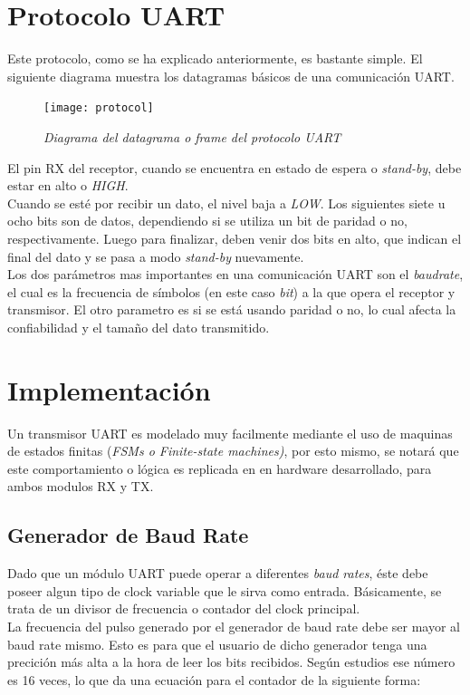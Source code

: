 \documentclass{article}
\begin{document}
\newpage
\section{Protocolo UART}
\indent Este protocolo, como se ha explicado anteriormente, es bastante simple. El siguiente diagrama muestra los
datagramas básicos de una comunicación UART.

\begin{figure}[H]
    \texttt{[image: protocol]}
    \caption{\textit{Diagrama del datagrama o frame del protocolo UART}}
\end{figure}

\indent El pin RX del receptor, cuando se encuentra en estado de espera o \textit{stand-by}, debe estar en alto o \textit{HIGH}. \\
Cuando se esté por recibir un dato, el nivel baja a \textit{LOW}. Los siguientes siete u ocho bits son de datos, dependiendo si
se utiliza un bit de paridad o no, respectivamente. Luego para finalizar, deben venir dos bits en alto, que indican el final del dato
y se pasa a modo \textit{stand-by} nuevamente. \\
\indent Los dos parámetros mas importantes en una comunicación UART son el \textit{baudrate}, el cual es la frecuencia de símbolos (en este caso \textit{bit}) a la que opera el receptor y transmisor. El otro parametro es si se está usando paridad o no, lo cual afecta la confiabilidad y el tamaño del dato transmitido.

\section{Implementación}
Un transmisor UART es modelado muy facilmente mediante el uso de maquinas de estados finitas (\textit{FSMs o Finite-state machines)},
por esto mismo, se notará que este comportamiento o lógica es replicada en en hardware desarrollado, para ambos modulos RX y TX. \\

\subsection{Generador de Baud Rate}
\indent Dado que un módulo UART puede operar a diferentes \textit{baud rates}, éste debe poseer algun tipo de clock variable que le
sirva como entrada. Básicamente, se trata de un divisor de frecuencia o contador del clock principal. \\
\indent La frecuencia del pulso generado por el generador de baud rate debe ser mayor al baud rate mismo. Esto es para que
el usuario de dicho generador tenga una precición más alta a la hora de leer los bits recibidos. Según estudios ese número es
16 veces, lo que da una ecuación para el contador de la siguiente forma: \\
\end{document}
